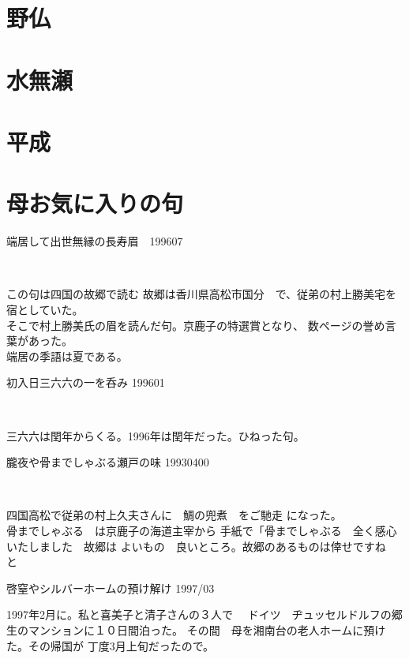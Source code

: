 \documentclass[b5paper]{tbook}
\begin{document}
\chapter{野仏}

\chapter{水無瀬}

\chapter{平成}

\vspace{0.6cm}
%
\chapter{母お気に入りの句}%
\begin{shiika}端居して出世無縁の長寿眉　\hfill{199607}　\end{shiika}　　　

この句は四国の故郷で読む
故郷は香川県高松市国分　で、従弟の村上勝美宅を宿としていた。
\\そこで村上勝美氏の眉を読んだ句。京鹿子の特選賞となり、
数ページの誉め言葉があった。\\端居の季語は夏である。

\vspace{5mm}
\begin{shiika}初入日三六六の一を呑み 199601　\end{shiika}　

三六六は閏年からくる。1996年は閏年だった。ひねった句。
\vspace{5mm}
\begin{shiika}朧夜や骨までしゃぶる瀬戸の味 19930400\end{shiika}　

四国高松で従弟の村上久夫さんに　鯛の兜煮　をご馳走
になった。
\\骨までしゃぶる　は京鹿子の海道主宰から
手紙で「骨までしゃぶる　全く感心いたしました　故郷は
よいもの　良いところ。故郷のあるものは倖せですね　と
\vspace{5mm}
\begin{shiika}啓窒やシルバーホームの預け解け 1997/03\end{shiika}

1997年2月に。私と喜美子と清子さんの３人で　
ドイツ　ヂュッセルドルフの郷生のマンションに１０日間泊った。
その間　母を湘南台の老人ホームに預けた。その帰国が
丁度3月上旬だったので。
\vspace{5mm}
\end{document}
